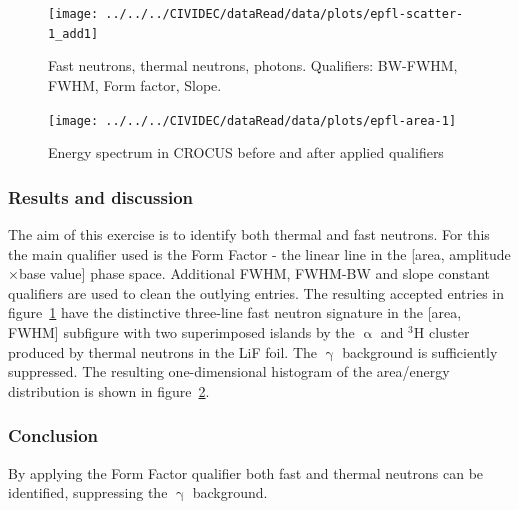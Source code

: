 \begin{figure}[]
\centering
\texttt{[image: ../../../CIVIDEC/dataRead/data/plots/epfl-scatter-1\_add1]}
\caption{Fast neutrons, thermal neutrons, photons. Qualifiers: BW-FWHM, FWHM, Form factor, Slope.}
\label{fig:scatterepfl2}
\end{figure}

\begin{figure}[]
\centering
\texttt{[image: ../../../CIVIDEC/dataRead/data/plots/epfl-area-1]}
\caption{Energy spectrum in CROCUS before and after applied qualifiers}
\label{fig:scatterepfl2area}
\end{figure}


\subsubsection{Results and discussion}
The aim of this exercise is to identify both thermal and fast neutrons. For this the main qualifier used is the Form Factor - the linear line in the [area, amplitude$\times$base value] phase space. Additional FWHM, FWHM-BW and slope constant qualifiers are used to clean the outlying entries. The resulting accepted entries in figure~\ref{fig:scatterepfl2} have the distinctive three-line fast neutron signature in the [area, FWHM] subfigure with two superimposed islands by the $\upalpha$ and $^3$H cluster produced by thermal neutrons in the LiF foil. The $\upgamma$ background is sufficiently suppressed. The resulting one-dimensional histogram of the area/energy distribution is shown in figure~\ref{fig:scatterepfl2area}.

\subsubsection{Conclusion}
By applying the Form Factor qualifier both fast and thermal neutrons can be identified, suppressing the $\upgamma$ background.



\clearpage
